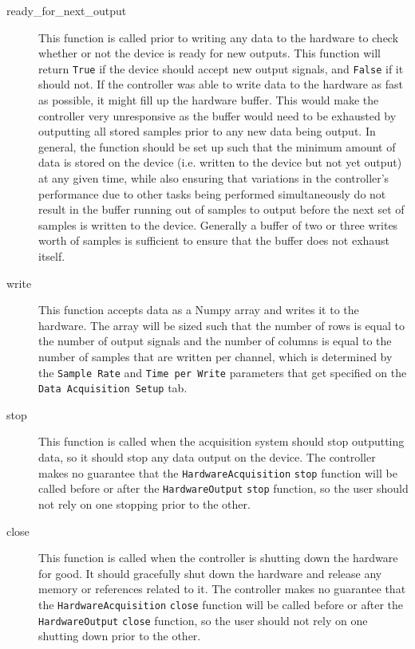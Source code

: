 \documentclass[pdf,12pt,report]{SANDreport}
\newcommand{\inlineCode}{\lstinline[basicstyle=\bfseries\ttfamily]}
\begin{document}
\begin{description}
        \item[ready\_for\_next\_output] This function is called prior to writing any data to the hardware to check whether or not the device is ready for new outputs.  This function will return \inlineCode{True} if the device should accept new output signals, and \inlineCode{False} if it should not.  If the controller was able to write data to the hardware as fast as possible, it might fill up the hardware buffer.  This would make the controller very unresponsive as the buffer would need to be exhausted by outputting all stored samples prior to any new data being output.  In general, the function should be set up such that the minimum amount of data is stored on the device (i.e. written to the device but not yet output) at any given time, while also ensuring that variations in the controller's performance due to other tasks being performed simultaneously do not result in the buffer running out of samples to output before the next set of samples is written to the device.  Generally a buffer of two or three writes worth of samples is sufficient to ensure that the buffer does not exhaust itself.
        \item[write] This function accepts data as a Numpy array and writes it to the hardware.  The array will be sized such that the number of rows is equal to the number of output signals and the number of columns is equal to the number of samples that are written per channel, which is determined by the \inlineCode{Sample Rate} and \inlineCode{Time per Write} parameters that get specified on the \inlineCode{Data Acquisition Setup} tab.
        \item[stop] This function is called when the acquisition system should stop outputting data, so it should stop any data output on the device.  The controller makes no guarantee that the \inlineCode{HardwareAcquisition} \inlineCode{stop} function will be called before or after the \inlineCode{HardwareOutput} \inlineCode{stop} function, so the user should not rely on one stopping prior to the other.
        \item[close] This function is called when the controller is shutting down the hardware for good.  It should gracefully shut down the hardware and release any memory or references related to it.  The controller makes no guarantee that the \inlineCode{HardwareAcquisition} \inlineCode{close} function will be called before or after the \inlineCode{HardwareOutput} \inlineCode{close} function, so the user should not rely on one shutting down prior to the other.
    \end{description}
    
\end{document}
